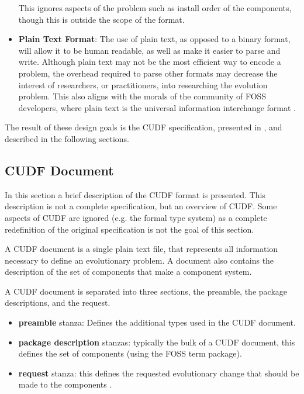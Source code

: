 \begin{itemize}
  This ignores aspects of the problem such as install order of the components, though this is outside the scope of the format.
  \item \textbf{Plain Text Format}:
  The use of plain text, as opposed to a binary format, will allow it to be human readable, as well as make it easier to parse and write.
  Although plain text may not be the most efficient way to encode a problem, 
  the overhead required to parse other formats may decrease the interest of researchers, or practitioners, into researching the evolution problem.
  This also aligns with the morals of the community of FOSS developers, where plain text is the universal information interchange format \citep{raymond2003art}.
\end{itemize}

The result of these design goals is the CUDF specification, presented in \citep{treinen2009common}, and described in the following sections.

\subsection{CUDF Document}
In this section a brief description of the CUDF format is presented.
This description is not a complete specification, but an overview of CUDF.
Some aspects of CUDF are ignored (e.g. the formal type system) as a complete redefinition of the original specification is not the goal of this section.

A CUDF document is a single plain text file, that represents all information necessary to define an evolutionary problem.
A document also contains the description of the set of components that make a component system.

A CUDF document is separated into three sections, the preamble, the package descriptions, and the request.

\begin{itemize}
  \item \textbf{preamble} stanza: Defines the additional types used in the CUDF document.
  \item \textbf{package description} stanzas: typically the bulk of a CUDF document, this defines the set of components (using the FOSS term package).
  \item \textbf{request} stanza: this defines the requested evolutionary change that should be made to the components .
\end{itemize}

